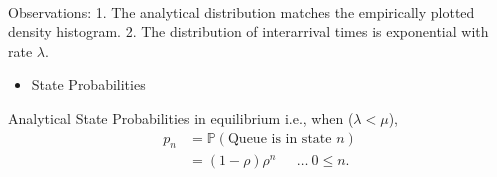 \documentclass[11pt]{article}
\providecommand{\tightlist}{%
      \setlength{\itemsep}{0pt}\setlength{\parskip}{0pt}}
\begin{document}
    \begin{center}
    \end{center}
    { \hspace*{\fill} \\}
    
    Observations: 1. The analytical distribution matches the empirically
plotted density histogram. 2. The distribution of interarrival times is
exponential with rate \(\lambda\).

    \begin{itemize}
\tightlist
\item
  State Probabilities
\end{itemize}

Analytical State Probabilities in equilibrium i.e., when
(\(\lambda < \mu\)), \begin{align}
p_n &= \mathbb{P}(\text{Queue is in state }n) \\
    &= (1 - \rho) \rho^n\ \quad\ \ldots\ 0 \leq n.
\end{align}
\end{document}
